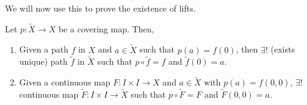 We will now use this to prove the existence of lifts. 
\begin{theorem}
	 Let $p: \widetilde{X} \to X$ be a covering map. Then, 
	\begin{enumerate}
		\item Given a path $f$ in $X$ and $a \in \widetilde{X}$ such that $p(a) = f(0)$, then $\exists !$ (exists unique) path $\widetilde{f}$ in $\widetilde{X}$ such that $p \circ \widetilde{f} = f$ and $\widetilde{f}(0) = a$. 
		\item Given a continuous map $F: I \times I \to X$ and $a \in \widetilde{X}$ with $p(a) = f(0,0)$, $\exists !$ continuous map $\widetilde{F}$$\colon I \times I \to \widetilde{X}$ such that $p \circ \widetilde{F} = F$ and $\widetilde{F}(0,0) = a$. 
	\end{enumerate}
\end{theorem}
